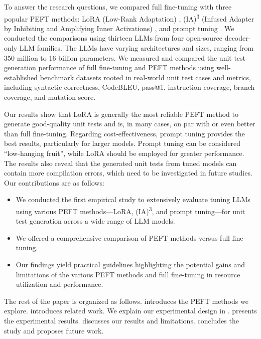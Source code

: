 \documentclass[12pt]{book}
\begin{document}
To answer the research questions, we compared full fine-tuning with three popular PEFT methods: LoRA (Low-Rank Adaptation) \citep{Yu2023LowRankAO}, (IA)\textsuperscript{3} (Infused Adapter by Inhibiting and Amplifying Inner Activations) \citep{Liu2022FewShotPF}, and prompt tuning \citep{Lester2021ThePO}. We conducted the comparisons using thirteen LLMs from four open-source decoder-only LLM families. The LLMs have varying architectures and sizes, ranging from 350 million to 16 billion parameters. We measured and compared the unit test generation performance of full fine-tuning and PEFT methods using well-established benchmark datasets rooted in real-world unit test cases and metrics, including syntactic correctness, CodeBLEU, pass@1, instruction coverage, branch coverage, and mutation score.

Our results show that LoRA is generally the most reliable PEFT method to generate good-quality unit tests and is, in many cases, on par with or even better than full fine-tuning. Regarding cost-effectiveness, prompt tuning provides the best results, particularly for larger models. Prompt tuning can be considered ``low-hanging fruit'', while LoRA should be employed for greater performance. The results also reveal that the generated unit tests from tuned models can contain more compilation errors, which need to be investigated in future studies.  
Our contributions are as follows:
\begin{itemize} 
    \item We conducted the first empirical study to extensively evaluate tuning LLMs using various PEFT methods—LoRA, (IA)\textsuperscript{3}, and prompt tuning—for unit test generation across a wide range of LLM models.
    \item We offered a comprehensive comparison of PEFT methods versus full fine-tuning.
    \item Our findings yield practical guidelines highlighting the potential gains and limitations of the various PEFT methods and full fine-tuning in resource utilization and performance.
\end{itemize}

The rest of the paper is organized as follows.  introduces the PEFT methods we explore.  introduces related work. We explain our experimental design in .  presents the experimental results.   discusses our results and limitations.  concludes the study and proposes future work.
\end{document}

